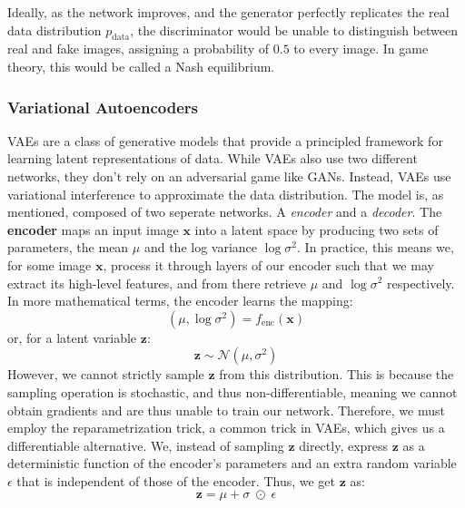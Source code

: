 \documentclass{article}
\begin{document}
Ideally, as the network improves, and the generator perfectly replicates the real data distribution $p_{\text{data}}$, the discriminator would be unable to distinguish between real and fake images, assigning a probability of $0.5$ to every image. In game theory, this would be called a Nash equilibrium.
\subsubsection{Variational Autoencoders}
VAEs are a class of generative models that provide a principled framework for learning latent representations of data. While VAEs also use two different networks, they don't rely on an adversarial game like GANs. Instead, VAEs use variational interference to approximate the data distribution. 
\newline
The model is, as mentioned, composed of two seperate networks. A \emph{encoder} and a \emph{decoder}. \newline
The \textbf{encoder} maps an input image $\mathbf{x}$ into a latent space by producing two sets of parameters, the mean $\mu$ and the log variance $\log \sigma^2$. In practice, this means we, for some image $\mathbf{x}$, process it through layers of our encoder such that we may extract its high-level features, and from there retrieve $\mu$ and $\log \sigma^2$ respectively. 
\newline
In more mathematical terms, the encoder learns the mapping:
\begin{equation}
    \left(\mu, \log \sigma^2 \right) = f_{\text{enc}}(\mathbf{x})
\end{equation}
or, for a latent variable $\mathbf{z}$:
\begin{equation}
    \mathbf{z} \sim \mathcal{N}(\mu, \sigma^2)
\end{equation}
However, we cannot strictly sample $\mathbf{z}$ from this distribution. This is because the sampling operation is stochastic, and thus non-differentiable, meaning we cannot obtain gradients and are thus unable to train our network. Therefore, we must employ the reparametrization trick, a common trick in VAEs, which gives us a differentiable alternative. 
\newline
We, instead of sampling $\mathbf{z}$ directly, express $\mathbf{z}$ as a deterministic function of the encoder's parameters and an extra random variable $\epsilon$ that is independent of those of the encoder. \newline Thus, we get $\mathbf{z}$ as:
\begin{equation}
    \mathbf{z} = \mu + \sigma \; \odot \;\epsilon
\end{equation}
\end{document}
